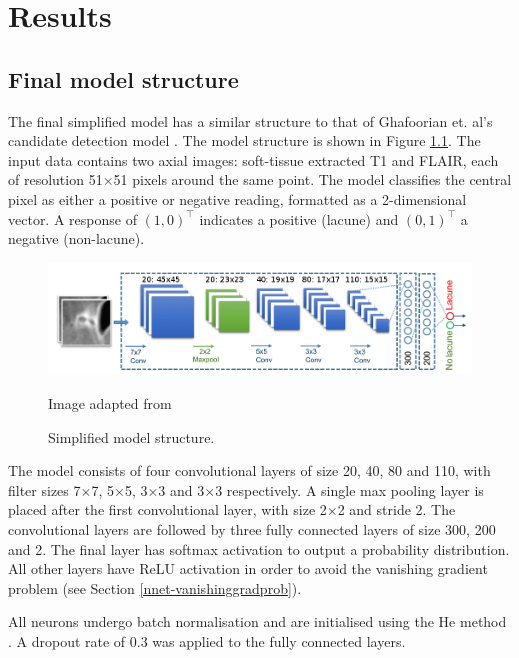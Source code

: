 


\chapter{Results}\label{results}

\section{Final model structure}

The final simplified model has a similar structure to that of Ghafoorian et. al's candidate detection model \cite{GhafoorianM.2017Dml3}. The model structure is shown in Figure \ref{results-model-fig}. The input data contains two axial images: soft-tissue extracted T1 and FLAIR, each of resolution 51$\times$51 pixels around the same point. The model classifies the central pixel as either a positive or negative reading, formatted as a 2-dimensional vector. A response of $(1,0)^\intercal$ indicates a positive (lacune) and $(0,1)^\intercal$ a negative (non-lacune).

\begin{figure}[ht]
	\centering
	\includegraphics[width=\textwidth]{Images/7_simplified_model.png}
	\caption{Simplified model structure.}
	\small Image adapted from \cite{GhafoorianM.2017Dml3}
	\label{results-model-fig}
\end{figure}

The model consists of four convolutional layers of size 20, 40, 80 and 110, with filter sizes 7$\times$7, 5$\times$5, 3$\times$3 and 3$\times$3 respectively. A single max pooling layer is placed after the first convolutional layer, with size 2$\times$2 and stride 2. The convolutional layers are followed by three fully connected layers of size 300, 200 and 2. The final layer has softmax activation to output a probability distribution. All other layers have ReLU activation in order to avoid the vanishing gradient problem (see Section \ref{nnet-vanishinggradprob}).

All neurons undergo batch normalisation and are initialised using the He method \cite{HeKaiming2015DDiR}. A dropout rate of 0.3 was applied to the fully connected layers.

